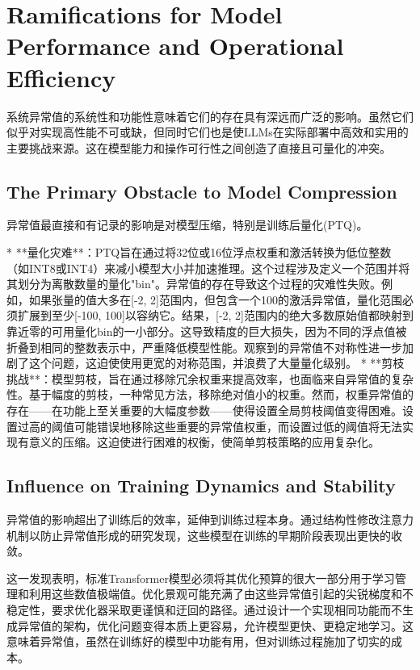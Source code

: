 \documentclass{article}
\begin{document}
\section{Ramifications for Model Performance and Operational Efficiency}

系统异常值的系统性和功能性意味着它们的存在具有深远而广泛的影响。虽然它们似乎对实现高性能不可或缺，但同时它们也是使LLMs在实际部署中高效和实用的主要挑战来源。这在模型能力和操作可行性之间创造了直接且可量化的冲突。

\subsection{The Primary Obstacle to Model Compression}

异常值最直接和有记录的影响是对模型压缩，特别是训练后量化(PTQ)。

* **量化灾难**：PTQ旨在通过将32位或16位浮点权重和激活转换为低位整数（如INT8或INT4）来减小模型大小并加速推理。这个过程涉及定义一个范围并将其划分为离散数量的量化"bin"。异常值的存在导致这个过程的灾难性失败。例如，如果张量的值大多在[-2, 2]范围内，但包含一个100的激活异常值，量化范围必须扩展到至少[-100, 100]以容纳它。结果，[-2, 2]范围内的绝大多数原始值都映射到靠近零的可用量化bin的一小部分。这导致精度的巨大损失，因为不同的浮点值被折叠到相同的整数表示中，严重降低模型性能。观察到的异常值不对称性进一步加剧了这个问题，这迫使使用更宽的对称范围，并浪费了大量量化级别。
* **剪枝挑战**：模型剪枝，旨在通过移除冗余权重来提高效率，也面临来自异常值的复杂性。基于幅度的剪枝，一种常见方法，移除绝对值小的权重。然而，权重异常值的存在——在功能上至关重要的大幅度参数——使得设置全局剪枝阈值变得困难。设置过高的阈值可能错误地移除这些重要的异常值权重，而设置过低的阈值将无法实现有意义的压缩。这迫使进行困难的权衡，使简单剪枝策略的应用复杂化。

\subsection{Influence on Training Dynamics and Stability}

异常值的影响超出了训练后的效率，延伸到训练过程本身。通过结构性修改注意力机制以防止异常值形成的研究发现，这些模型在训练的早期阶段表现出更快的收敛。

这一发现表明，标准Transformer模型必须将其优化预算的很大一部分用于学习管理和利用这些数值极端值。优化景观可能充满了由这些异常值引起的尖锐梯度和不稳定性，要求优化器采取更谨慎和迂回的路径。通过设计一个实现相同功能而不生成异常值的架构，优化问题变得本质上更容易，允许模型更快、更稳定地学习。这意味着异常值，虽然在训练好的模型中功能有用，但对训练过程施加了切实的成本。
\end{document}
